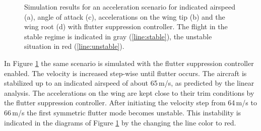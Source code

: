 \documentclass[aerospace,article,submit,moreauthors,pdftex,10pt,a4paper]{Definitions/mdpi}
\begin{document}
\begin{figure}[htb]
	\centering
	
	\caption{Simulation results for an acceleration scenario for indicated airspeed (a), angle of attack (c), accelerations on the wing tip (b) and the wing root (d) with flutter suppression controller. The flight in the stable regime is indicated in gray (\ref{line:stable}), the unstable situation in red (\ref{line:unstable}).}
	\label{fig:cl}	
\end{figure}

In Figure \ref{fig:cl} the same scenario is simulated with the flutter suppression controller enabled. The velocity is increased  step-wise until flutter occurs. The aircraft is stabilized up to an indicated airspeed of about 65\,m/s, as predicted by the linear analysis. The accelerations on the wing are kept close to their trim conditions  by the flutter suppression controller. After initiating the velocity step from 64\,m/s to 66\,m/s the first symmetric flutter mode becomes unstable. This instability is indicated in the diagrams of Figure \ref{fig:cl} by the changing the line color to red.
\end{document}
